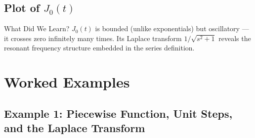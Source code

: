 \documentclass[12pt,a4paper]{article}
\begin{document}
\subsection{Plot of $J_0(t)$}

\begin{center}
\end{center}

\begin{learnbox}{What Did We Learn?}
$J_0(t)$ is bounded (unlike exponentials) but oscillatory --- it crosses zero
infinitely many times. Its Laplace transform $1/\sqrt{s^2+1}$ reveals the
resonant frequency structure embedded in the series definition.
\end{learnbox}

\section{Worked Examples}

\subsection{Example 1: Piecewise Function, Unit Steps, and the Laplace Transform}
\end{document}
